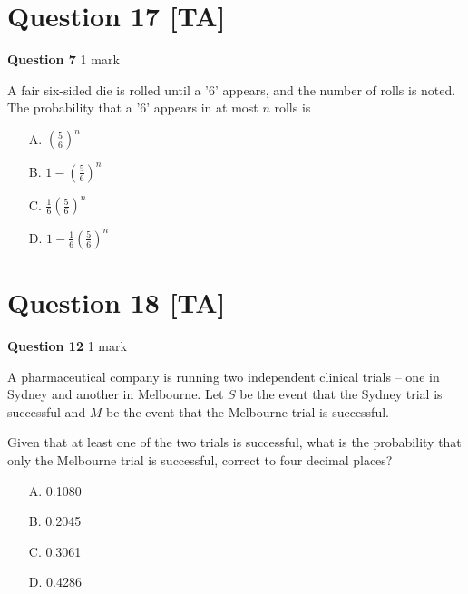 \documentclass[10pt,a4paper]{article}
\begin{document}
\vspace{9\baselineskip}

\hrulefill

\section*{Question 17 [TA]}

\textbf{Question 7} \hfill 1 mark

A fair six-sided die is rolled until a '6' appears, and the number of rolls is noted. The probability that a '6' appears in at most $n$ rolls is

\begin{enumerate}
    \item[A.] $\left(\frac{5}{6}\right)^n$
    \item[B.] $1 - \left(\frac{5}{6}\right)^n$
    \item[C.] $\frac{1}{6}\left(\frac{5}{6}\right)^n$
    \item[D.] $1 - \frac{1}{6}\left(\frac{5}{6}\right)^n$
\end{enumerate}

\vspace{9\baselineskip}

\hrulefill

\section*{Question 18 [TA]}

\textbf{Question 12} \hfill 1 mark

A pharmaceutical company is running two independent clinical trials -- one in Sydney and another in Melbourne. Let $S$ be the event that the Sydney trial is successful and $M$ be the event that the Melbourne trial is successful.

Given that at least one of the two trials is successful, what is the probability that only the Melbourne trial is successful, correct to four decimal places?

\begin{enumerate}
    \item[A.] 0.1080
    \item[B.] 0.2045
    \item[C.] 0.3061
    \item[D.] 0.4286
\end{enumerate}

\vspace{9\baselineskip}

\hrulefill
\end{document}
